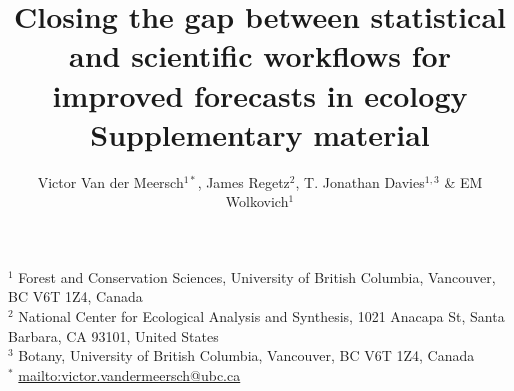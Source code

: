 \documentclass[11pt]{article}
\begin{document}
\title{\large Closing the gap between statistical and scientific workflows for improved forecasts in ecology\\Supplementary material}
\date{}
\author{\small Victor Van der Meersch$^{1*}$, James Regetz$^{2}$, T. Jonathan Davies$^{1,3}$ \& EM Wolkovich$^{1}$}
\maketitle
{\footnotesize \noindent $^{1}$ Forest and Conservation Sciences, University of British Columbia, Vancouver, BC V6T 1Z4, Canada\\
$^{2}$ National Center for Ecological Analysis and Synthesis, 1021 Anacapa St, Santa Barbara, CA 93101, United States\\
$^{3}$ Botany, University of British Columbia, Vancouver, BC V6T 1Z4, Canada \\
$^{*}$ \url{mailto:victor.vandermeersch@ubc.ca}

\renewcommand{\thefigure}{S\arabic{figure}}

}
\end{document}
